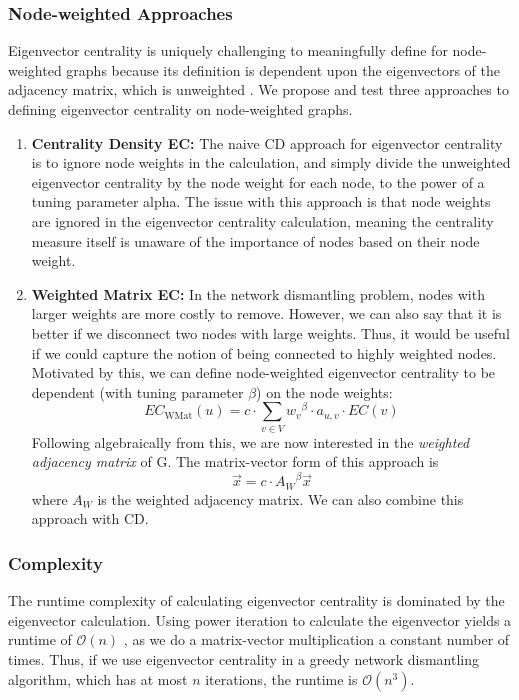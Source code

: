 \documentclass{article}
\begin{document}
\subsubsection{Node-weighted Approaches}
Eigenvector centrality is uniquely challenging to meaningfully define for node-weighted graphs because its definition is dependent upon the eigenvectors of the adjacency matrix, which is unweighted \cite{singh}.
We propose and test three approaches to defining eigenvector centrality on node-weighted graphs.
\begin{enumerate}[label=\textbf{\Alph*}.]
\item \textbf{Centrality Density EC:} The naive CD approach for eigenvector centrality is to ignore node weights in the calculation, and simply divide the unweighted eigenvector centrality by the node weight for each node, to the power of a tuning parameter alpha. The issue with this approach is that node weights are ignored in the eigenvector centrality calculation, meaning the centrality measure itself is unaware of the importance of nodes based on their node weight.
\item \textbf{Weighted Matrix EC:} In the network dismantling problem, nodes with larger weights are more costly to remove. However, we can also say that it is better if we disconnect two nodes with large weights. Thus, it would be useful if we could capture the notion of being connected to highly weighted nodes. Motivated by this, we can define node-weighted eigenvector centrality to be dependent (with tuning parameter $\beta$) on the node weights: $$ EC_{\text{WMat}}(u) = c \cdot \sum_{v \in V} {w_v}^\beta \cdot a_{u,v} \cdot EC(v) $$ Following algebraically from this, we are now interested in the \textit{weighted adjacency matrix} of G. The matrix-vector form of this approach is $$ \Vec{x} = c \cdot {A_W}^{\beta} \Vec{x} $$ where $A_W$ is the weighted adjacency matrix. 
We can also combine this approach with CD.
\end{enumerate}

\subsubsection{Complexity}
The runtime complexity of calculating eigenvector centrality is dominated by the eigenvector calculation. Using power iteration to calculate the eigenvector yields a runtime of $\mathcal{O}(n)$ \cite{gnd}, as we do a matrix-vector multiplication a constant number of times. Thus, if we use eigenvector centrality in a greedy network dismantling algorithm, which has at most $n$ iterations, the runtime is $\mathcal{O}(n^3)$. 
\end{document}
